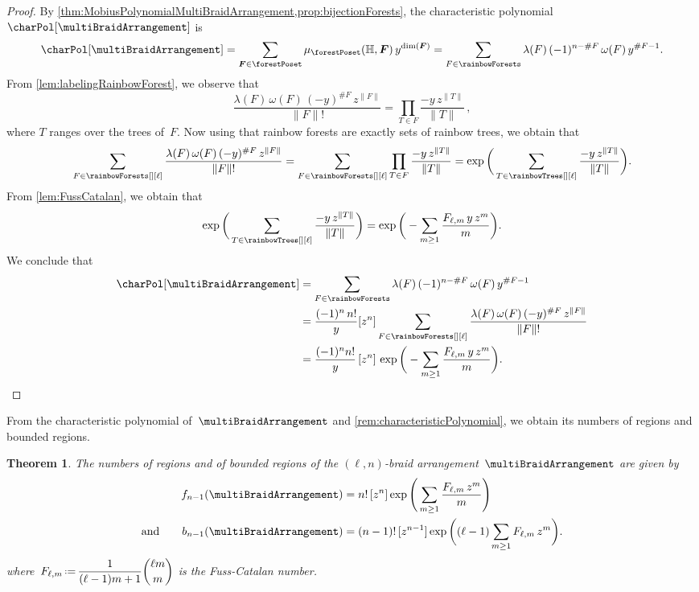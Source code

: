 \documentclass{amsart}
\newtheorem{theorem}{Theorem}[section]
\theoremstyle{definition}
\renewcommand{\b}[1]{{\boldsymbol{#1}}} %
\newcommand{\eqdef}{\mbox{\,\raisebox{0.2ex}{\scriptsize\ensuremath{\mathrm:}}\ensuremath{=}\,}} %
\renewcommand{\b}[1]{\boldsymbol{#1}} %
\newcommand{\HH}{\mathbb{H}} %
\begin{document}
\begin{proof}
By \cref{thm:MobiusPolynomialMultiBraidArrangement,prop:bijectionForests}, the characteristic polynomial~$\charPol[\multiBraidArrangement]$ is
\[
\charPol[\multiBraidArrangement] = \sum_{\b{F} \in \forestPoset} \mu_{\forestPoset}(\HH, \b{F}) \, y^{\dim(\b{F})} = \sum_{F \in \rainbowForests} \lambda(F) \, (-1)^{n-\#F} \, \omega(F) \, y^{\#F-1}.
\]
From \cref{lem:labelingRainbowForest}, we observe that
\[
\frac{\lambda(F) \, \omega(F) \, (-y)^{\#F} \, z^{\|F\|}}{\|F\|!} = \prod_{T \in F} \frac{-y \, z^{\|T\|}}{\|T\|} \, ,
\]
where $T$ ranges over the trees of~$F$.
Now using that rainbow forests are exactly sets of rainbow trees, we obtain that
\[
\sum_{F \in \rainbowForests[][\ell]} \frac{ \lambda(F) \, \omega(F) \, (-y)^{\#F} \, z^{\|F\|}}{\|F\|!} = \sum_{F \in \rainbowForests[][\ell]} \prod_{T \in F} \frac{-y \, z^{\|T\|}}{\|T\|} = \exp \bigg( \sum_{T \in \rainbowTrees[][\ell]} \frac{-y \, z^{\|T\|}}{\|T\|} \bigg).
\]
From \cref{lem:FussCatalan}, we obtain that
\[
\exp \bigg( \sum_{T \in \rainbowTrees[][\ell]} \frac{-y \, z^{\|T\|}}{\|T\|} \bigg) = \exp \bigg( - \sum_{m \ge 1} \frac{F_{\ell,m} \, y \, z^m}{m} \bigg).
\]
We conclude that
\begin{align*}
\charPol[\multiBraidArrangement] 
& = \sum_{F \in \rainbowForests}  \lambda(F) \, (-1)^{n-\#F} \, \omega(F) \, y^{\#F-1} \\
& = \frac{(-1)^n \, n!}{y} [z^n] \sum_{F \in \rainbowForests[][\ell]} \frac{ \lambda(F) \, \omega(F) \, (-y)^{\#F} \, z^{\|F\|}}{\|F\|!} \\
& = \frac{(-1)^n n!}{y} \, [z^n] \, \exp \bigg( - \sum_{m \ge 1} \frac{F_{\ell,m} \, y \, z^m}{m} \bigg).
\qedhere
\end{align*}
\end{proof}

From the characteristic polynomial of~$\multiBraidArrangement$ and \cref{rem:characteristicPolynomial}, we obtain its numbers of regions and bounded regions.

\begin{theorem}
\label{thm:regionsMultiBraidArrangement}
The numbers of regions and of bounded regions of the $(\ell,n)$-braid arrangement~$\multiBraidArrangement$ are given by
\begin{align*}
f_{n-1}(\multiBraidArrangement) 
& = n! \, [z^n] \exp \Bigg( \sum_{m \ge 1} \frac{F_{\ell,m} \, z^m}{m} \Bigg) \\
\text{and}\qquad
b_{n-1}(\multiBraidArrangement)
& = (n-1)! \, [z^{n-1}] \exp \bigg( (\ell-1) \sum_{m \ge 1} F_{\ell,m} \, z^m \bigg).
\end{align*}
where~$\displaystyle F_{\ell,m} \eqdef \frac{1}{(\ell-1)m+1} \binom{\ell m}{m}$ is the Fuss-Catalan number.
\end{theorem}
\end{document}

